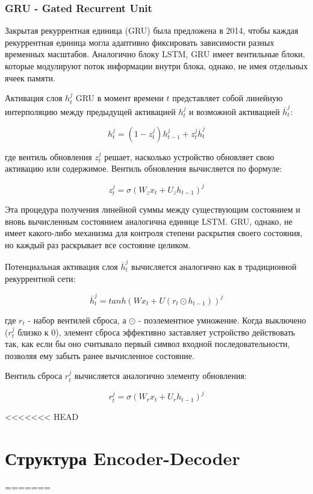 \documentclass[a4paper,russian]{article}
\begin{document}
	\clearpage
	
	\subsubsection{GRU - Gated Recurrent Unit}
	
	Закрытая рекуррентная единица (GRU) была предложена в 2014, чтобы каждая рекуррентная единица
	могла адаптивно фиксировать зависимости разных временных масштабов. Аналогично блоку LSTM, GRU имеет
	вентильные блоки, которые модулируют поток информации внутри блока, однако, не имея отдельных
	ячеек памяти.
	
	Активация слоя $h^{j}_{t}$ GRU в момент времени $t$ представляет собой линейную интерполяцию между предыдущей активацией $h^{j}_{t}$ и возможной активацией $\overline{h}^{j}_{t}$:
	
	$$ h^{j}_{t} = (1 - z^{j}_{t})h^{j}_{t - 1} + z^{j}_{t} \overline{h}^{j}_{t} $$
	
	где вентиль обновления $z^{j}_{t}$ решает, насколько устройство обновляет свою активацию или содержимое. Вентиль обновления вычисляется по формуле:
	
 	$$ z^{j}_{t} = \sigma(W_z x_t + U_z h_{t - 1})^j $$

	Эта процедура получения линейной суммы между существующим состоянием и вновь вычисленным состоянием аналогична единице LSTM. GRU, однако, не имеет какого-либо механизма для контроля степени раскрытия своего состояния, но каждый раз раскрывает все состояние целиком.
	
	Потенциальная активация слоя $\overline{h}^{j}_{t}$ вычисляется аналогично как в традиционной рекуррентной сети:
	
	$$ \overline{h}^{j}_{t} = tanh(W x_t + U(r_t \odot h_{t - 1}))^j $$
	
	где $r_t$ - набор вентилей сброса, а $\odot$ - поэлементное умножение. Когда выключено ($r^{j}_{t}$ близко к 0), элемент сброса эффективно заставляет устройство действовать так, как если бы оно считывало первый символ входной последовательности, позволяя ему забыть ранее вычисленное состояние.
	
	Вентиль сброса $r^{j}_{t}$ вычисляется аналогично элементу обновления:
	
	$$ r^{j}_{t} = \sigma(W_r x_t + U_r h_{t - 1})^j $$
	
 	\clearpage
	
<<<<<<< HEAD
	\section{Структура Encoder-Decoder}
=======
\end{document}
